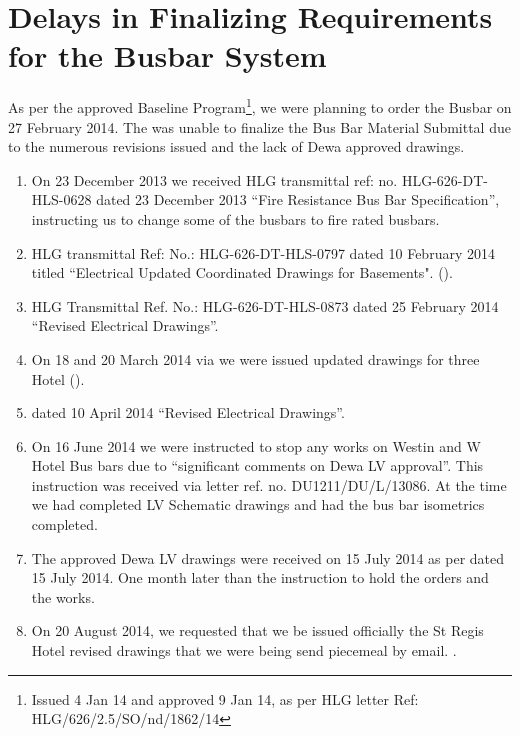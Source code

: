 
\chapter{Delays in Finalizing Requirements for the Busbar System}

As per the approved Baseline Program\footnote{Issued 4 Jan 14 and approved 9 Jan 14, as per HLG letter Ref: HLG/626/2.5/SO/nd/1862/14},  we were planning to order the Busbar on 27 February 2014. The \JV was unable to finalize the Bus Bar Material Submittal due to the numerous revisions issued and the lack of Dewa approved drawings.

\begin{enumerate}
\item On 23 December 2013 we received HLG transmittal ref: no. HLG-626-DT-HLS-0628 dated 23 December 2013 ``Fire Resistance Bus Bar Specification'', instructing us to change some of the busbars to fire rated busbars.
\label{fireratedbusbar}

\item HLG transmittal Ref: No.: HLG-626-DT-HLS-0797 dated 10 February 2014 titled ``Electrical Updated Coordinated Drawings for Basements". ().

\item HLG Transmittal Ref. No.: HLG-626-DT-HLS-0873 dated 25 February 2014 ``Revised Electrical Drawings''.

\item On 18 and 20 March 2014 via  we were issued updated drawings for three Hotel ().  

\item {} dated 10 April 2014 ``Revised Electrical Drawings''. 

\item On 16 June 2014 we were instructed to stop any works on Westin and W Hotel Bus bars due to ``significant comments on Dewa LV approval''. This instruction was received via \KA letter ref. no. DU1211/DU/L/13086. At the time we had completed LV Schematic drawings and had the bus bar isometrics completed. 

\item The approved Dewa LV drawings were received on 15 July 2014 as per  dated 15 July 2014. One month later than the instruction to hold the orders and the works.

\item On 20 August 2014, we requested that we be issued officially the St Regis Hotel revised drawings that we were being send piecemeal by email. .


\end{enumerate}
